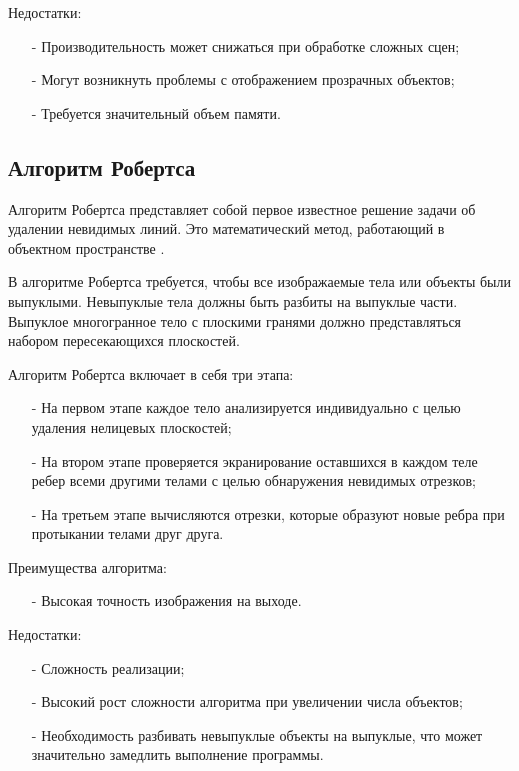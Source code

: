 Недостатки:
\begin{itemize}[label=\arabic*)]
	\item[-] Производительность может снижаться при обработке сложных сцен;
	\item[-] Могут возникнуть проблемы с отображением прозрачных объектов;
	\item[-] Требуется значительный объем памяти.
\end{itemize}

\subsection{Алгоритм Робертса}

Алгоритм Робертса представляет собой первое известное решение задачи об удалении невидимых линий. Это математический метод, работающий в объектном пространстве \cite{b2}.

В алгоритме Робертса требуется, чтобы все изображаемые тела или объекты были выпуклыми. Невыпуклые тела должны быть разбиты на выпуклые части. Выпуклое многогранное тело с плоскими гранями должно представляться набором пересекающихся плоскостей.

Алгоритм Робертса включает в себя три этапа:
\begin{itemize}[label=\arabic*)]
	\item[-] На первом этапе каждое тело анализируется индивидуально с целью удаления нелицевых плоскостей;
	\item[-] На втором этапе проверяется экранирование оставшихся в каждом теле ребер всеми другими телами с целью обнаружения невидимых отрезков;
	\item[-] На третьем этапе вычисляются отрезки, которые образуют новые ребра при протыкании телами друг друга.
\end{itemize}

Преимущества алгоритма:
\begin{itemize}[label=\arabic*)]
	\item[-] Высокая точность изображения на выходе.
\end{itemize}
Недостатки:
\begin{itemize}[label=\arabic*)]
	\item[-] Сложность реализации;
	\item[-] Высокий рост сложности алгоритма при увеличении числа объектов;
	\item[-] Необходимость разбивать невыпуклые объекты на выпуклые, что может значительно замедлить выполнение программы.
\end{itemize}

